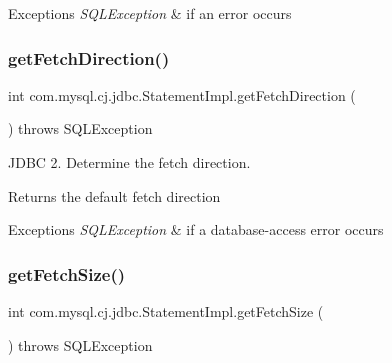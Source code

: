 \begin{DoxyExceptions}{Exceptions}
{\em S\+Q\+L\+Exception} & if an error occurs \\
\hline
\end{DoxyExceptions}
\mbox{\label{classcom_1_1mysql_1_1cj_1_1jdbc_1_1_statement_impl_ab0ef6daffffd7fd9dc6405c78b697b7d}} 
\subsubsection{\texorpdfstring{get\+Fetch\+Direction()}{getFetchDirection()}}
{\footnotesize\ttfamily int com.\+mysql.\+cj.\+jdbc.\+Statement\+Impl.\+get\+Fetch\+Direction (\begin{DoxyParamCaption}{ }\end{DoxyParamCaption}) throws S\+Q\+L\+Exception}

J\+D\+BC 2. Determine the fetch direction.

\begin{DoxyReturn}{Returns}
the default fetch direction
\end{DoxyReturn}

\begin{DoxyExceptions}{Exceptions}
{\em S\+Q\+L\+Exception} & if a database-\/access error occurs \\
\hline
\end{DoxyExceptions}
\mbox{\label{classcom_1_1mysql_1_1cj_1_1jdbc_1_1_statement_impl_a2e309596729b0de9bc9230e745c9350f}} 
\subsubsection{\texorpdfstring{get\+Fetch\+Size()}{getFetchSize()}}
{\footnotesize\ttfamily int com.\+mysql.\+cj.\+jdbc.\+Statement\+Impl.\+get\+Fetch\+Size (\begin{DoxyParamCaption}{ }\end{DoxyParamCaption}) throws S\+Q\+L\+Exception}

